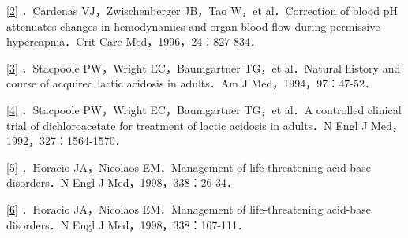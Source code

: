 \protect\hyperlink{text00026.htmlux5cux23ch2-25-back}{{[}2{]}}
．Cardenas VJ，Zwischenberger JB，Tao W，et al．Correction of blood pH
attenuates changes in hemodynamics and organ blood flow during
permissive hypercapnia．Crit Care Med，1996，24：827-834．

\protect\hyperlink{text00026.htmlux5cux23ch3-25-back}{{[}3{]}}
．Stacpoole PW，Wright EC，Baumgartner TG，et al．Natural history and
course of acquired lactic acidosis in adults．Am J
Med，1994，97：47-52．

\protect\hyperlink{text00026.htmlux5cux23ch4-25-back}{{[}4{]}}
．Stacpoole PW，Wright EC，Baumgartner TG，et al．A controlled clinical
trial of dichloroacetate for treatment of lactic acidosis in adults．N
Engl J Med，1992，327：1564-1570．

\protect\hyperlink{text00026.htmlux5cux23ch5-25-back}{{[}5{]}} ．Horacio
JA，Nicolaos EM．Management of life-threatening acid-base disorders．N
Engl J Med，1998，338：26-34．

\protect\hyperlink{text00026.htmlux5cux23ch6-25-back}{{[}6{]}} ．Horacio
JA，Nicolaos EM．Management of life-threatening acid-base disorders．N
Engl J Med，1998，338：107-111．

\protect\hypertarget{text00027.html}{}{}

